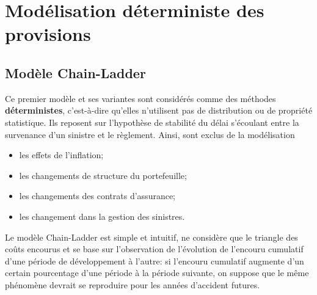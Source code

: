 
\chapter{Modélisation déterministe des provisions}
\label{chap:deterministe}

\section{Modèle Chain-Ladder}
\label{sec:deterministe:CL}

Ce premier modèle et ses variantes sont considérés comme des méthodes
\textbf{déterministes}, c'est-à-dire qu'elles n'utilisent pas de
distribution ou de propriété statistique. Ils reposent sur l'hypothèse
de stabilité du délai s'écoulant entre la survenance d'un sinistre et
le règlement. Ainsi, sont exclus de la modélisation
\begin{itemize}
\item les effets de l'inflation;
\item les changements de structure du portefeuille;
\item les changements des contrats d'assurance;
\item les changement dans la gestion des sinistres.
\end{itemize}

Le modèle Chain-Ladder est simple et intuitif, ne considère que le
triangle des coûts encourus et se base sur l'observation de
l'évolution de l'encouru cumulatif d'une période de développement à
l'autre: si l'encouru cumulatif augmente d'un certain pourcentage
d'une période à la période suivante, on suppose que le même phénomène
devrait se reproduire pour les années d'accident futures.

